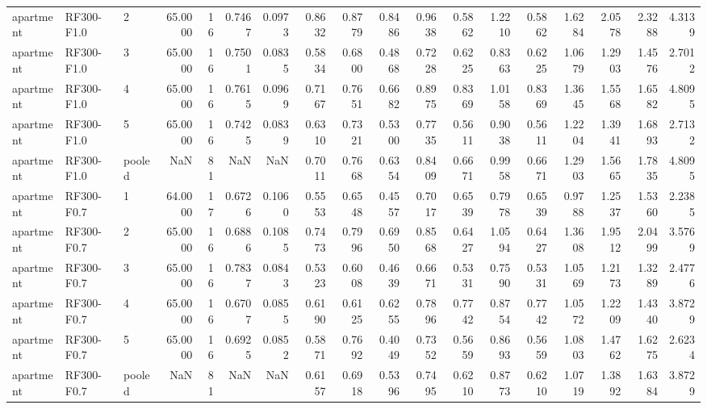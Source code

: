 \begin{tabular}{lllrrrrrrrrrrrrrrr}
apartment & RF300-F1.0 & 2 & 65.0000 & 16 & 0.7467 & 0.0973 & 0.8632 & 0.8779 & 0.8486 & 0.9638 & 0.5862 & 1.2210 & 0.5862 & 1.6284 & 2.0578 & 2.3288 & 4.3139 \\
apartment & RF300-F1.0 & 3 & 65.0000 & 16 & 0.7501 & 0.0835 & 0.5834 & 0.6800 & 0.4868 & 0.7228 & 0.6225 & 0.8363 & 0.6225 & 1.0679 & 1.2903 & 1.4576 & 2.7012 \\
apartment & RF300-F1.0 & 4 & 65.0000 & 16 & 0.7615 & 0.0969 & 0.7167 & 0.7651 & 0.6682 & 0.8975 & 0.8369 & 1.0158 & 0.8369 & 1.3645 & 1.5568 & 1.6582 & 4.8095 \\
apartment & RF300-F1.0 & 5 & 65.0000 & 16 & 0.7425 & 0.0839 & 0.6310 & 0.7321 & 0.5300 & 0.7735 & 0.5611 & 0.9038 & 0.5611 & 1.2204 & 1.3941 & 1.6893 & 2.7132 \\
apartment & RF300-F1.0 & pooled & NaN & 81 & NaN & NaN & 0.7011 & 0.7668 & 0.6354 & 0.8409 & 0.6671 & 0.9958 & 0.6671 & 1.2903 & 1.5665 & 1.7835 & 4.8095 \\
apartment & RF300-F0.7 & 1 & 64.0000 & 17 & 0.6726 & 0.1060 & 0.5553 & 0.6548 & 0.4557 & 0.7017 & 0.6539 & 0.7978 & 0.6539 & 0.9788 & 1.2537 & 1.5360 & 2.2385 \\
apartment & RF300-F0.7 & 2 & 65.0000 & 16 & 0.6886 & 0.1085 & 0.7473 & 0.7996 & 0.6950 & 0.8568 & 0.6427 & 1.0594 & 0.6427 & 1.3608 & 1.9512 & 2.0499 & 3.5769 \\
apartment & RF300-F0.7 & 3 & 65.0000 & 16 & 0.7837 & 0.0843 & 0.5323 & 0.6008 & 0.4639 & 0.6671 & 0.5331 & 0.7590 & 0.5331 & 1.0569 & 1.2173 & 1.3289 & 2.4776 \\
apartment & RF300-F0.7 & 4 & 65.0000 & 16 & 0.6707 & 0.0855 & 0.6190 & 0.6125 & 0.6255 & 0.7896 & 0.7742 & 0.8754 & 0.7742 & 1.0572 & 1.2209 & 1.4340 & 3.8729 \\
apartment & RF300-F0.7 & 5 & 65.0000 & 16 & 0.6925 & 0.0852 & 0.5871 & 0.7692 & 0.4049 & 0.7352 & 0.5659 & 0.8693 & 0.5659 & 1.0803 & 1.4762 & 1.6275 & 2.6234 \\
apartment & RF300-F0.7 & pooled & NaN & 81 & NaN & NaN & 0.6157 & 0.6918 & 0.5396 & 0.7495 & 0.6210 & 0.8773 & 0.6210 & 1.0719 & 1.3892 & 1.6384 & 3.8729 \\
\bottomrule
\end{tabular}
